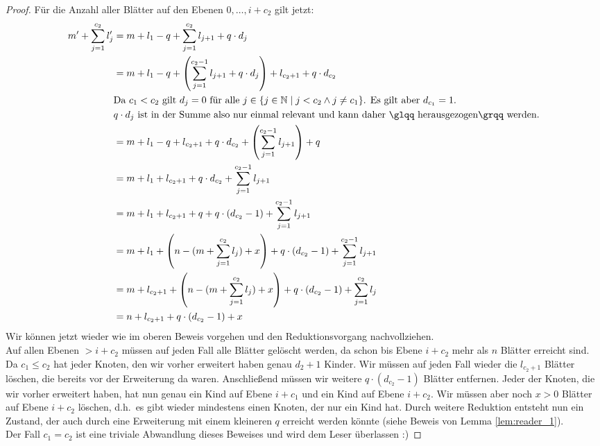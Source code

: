 \documentclass[a4paper,10pt,ngerman]{scrartcl}
\begin{document}
\begin{proof}
        Für die Anzahl aller Blätter auf den Ebenen $0, \dots, i + c_2$ gilt jetzt:
        \begin{equation}
            \begin{aligned}
                m' + \sum^{c_2}_{j=1} l_j' &= m + l_1 - q + \sum^{c_2}_{j=1} l_{j+1} + q \cdot d_j\\
                &= m + l_1 - q + \left(\sum^{c_2-1}_{j=1} l_{j+1} + q \cdot d_j\right) + l_{c_2 + 1} + q \cdot d_{c_2}\\
                &\text{Da $c_1 < c_2$ gilt $d_j = 0$ für alle $j \in \{j \in \mathbb N \mid j < c_2 \land j \neq c_1\}$. Es gilt aber $d_{c_1} = 1$.} \\
                &\text{$q \cdot d_j$ ist in der Summe also nur einmal relevant und kann daher \glqq herausgezogen\grqq~werden.} \\
                &= m + l_1 - q + l_{c_2 + 1} + q \cdot d_{c_2} + \left(\sum^{c_2-1}_{j=1} l_{j+1}\right) + q\\
                &= m + l_1 + l_{c_2 + 1} + q \cdot d_{c_2} + \sum^{c_2-1}_{j=1} l_{j+1}\\
                &=m + l_1 + l_{c_2 + 1} + q + q \cdot (d_{c_2} - 1)  + \sum^{c_2-1}_{j=1} l_{j+1} \\
                &= m + l_1 +  \left(n - (m + \sum^{c_2}_{j=1} l_j) + x\right) + q \cdot (d_{c_2} - 1) + \sum^{c_2-1}_{j=1} l_{j+1} \\
                &= m + l_{c_2 + 1} +  \left(n - (m + \sum^{c_2}_{j=1} l_j) + x\right) + q \cdot (d_{c_2} - 1) + \sum^{c_2}_{j=1} l_{j} \\
                &= n + l_{c_2 + 1} + q \cdot (d_{c_2} - 1) + x\\
            \end{aligned}\label{eq:equation2}
        \end{equation}
        Wir können jetzt wieder wie im oberen Beweis vorgehen und den Reduktionsvorgang nachvollziehen. \\
        Auf allen Ebenen $> i + c_2$ müssen auf jeden Fall alle Blätter gelöscht werden, da schon bis Ebene $i + c_2$ mehr als $n$ Blätter erreicht sind.
        Da $c_1 \le c_2$ hat jeder Knoten, den wir vorher erweitert haben genau $d_2 + 1$ Kinder.
        Wir müssen auf jeden Fall wieder die $l_{c_2 + 1}$ Blätter löschen, die bereits vor der Erweiterung da waren.
        Anschließend müssen wir weitere $q \cdot (d_{c_2} - 1)$ Blätter entfernen.
        Jeder der Knoten, die wir vorher erweitert haben, hat nun genau ein Kind auf Ebene $i + c_1$ und ein Kind auf Ebene $i + c_2$.
        Wir müssen aber noch $x > 0$ Blätter auf Ebene $i + c_2$ löschen, d.h.\ es gibt wieder mindestens einen Knoten, der nur ein Kind hat.
        Durch weitere Reduktion entsteht nun ein Zustand, der auch durch eine Erweiterung mit einem kleineren $q$ erreicht werden könnte (siehe Beweis von Lemma \ref{lem:reader_1}). \\
        Der Fall $c_1 = c_2$ ist eine triviale Abwandlung dieses Beweises und wird dem Leser überlassen :)
    \end{proof}
\end{document}
